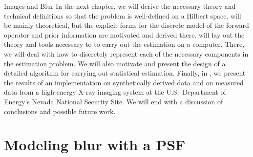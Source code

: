 \begin{chapter}{Images and Blur}
  In the next chapter, we will derive the necessary theory and technical definitions so that the problem is well-defined on a Hilbert space.
   will be mainly theoretical, but the explicit forms for the discrete model of the forward operator and prior information are motivated and derived there.
   will lay out the theory and tools necessary to to carry out the estimation on a computer.
  There, we will deal with how to discretely represent each of the necessary components in the estimation problem.
  We will also motivate and present the design of a detailed algorithm for carrying out statistical estimation.
  Finally, in , we present the results of an implementation on synthetically derived data and on measured data from a high-energy X-ray imaging system at the U.S.~Department of Energy's Nevada National Security Site.
  We will end with a discussion of conclusions and possible future work.


\section{Modeling blur with a PSF}
  

\end{chapter}
